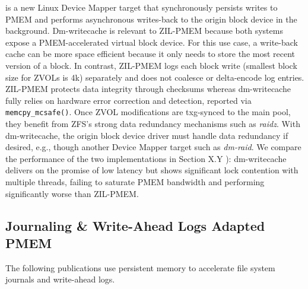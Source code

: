 \documentclass[12pt,a4paper,twoside]{book}
\begin{document}
 is a new Linux Device Mapper target that synchronously persists writes to PMEM and performs asynchronous writes-back to the origin block device in the background.
Dm-writecache is relevant to ZIL-PMEM because both systems expose a PMEM-accelerated virtual block device.
For this use case, a write-back cache can be more space efficient because it only needs to store the most recent version of a block.
In contrast, ZIL-PMEM logs each block write (smallest block size for ZVOLs is 4k) separately and does not coalesce or delta-encode log entries.
ZIL-PMEM protects data integrity through checksums whereas dm-writecache fully relies on hardware error correction and detection, reported via \lstinline{memcpy_mcsafe()}.
Once ZVOL modifications are txg-synced to the main pool, they benefit from ZFS's strong data redundancy mechanisms such as \textit{raidz}.
With dm-writecache, the origin block device driver must handle data redundancy if desired, e.g., though another Device Mapper target such as \textit{dm-raid}.
We compare the performance of the two implementations in Section X.Y ):
dm-writecache delivers on the promise of low latency but shows significant lock contention with multiple threads, failing to saturate PMEM bandwidth and performing significantly worse than ZIL-PMEM.

\subsection{Journaling \& Write-Ahead Logs Adapted PMEM}
The following publications use persistent memory to accelerate file system journals and write-ahead logs.
\end{document}
